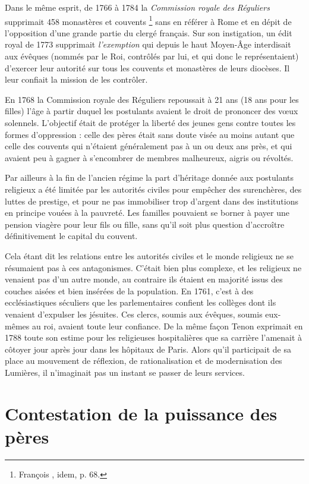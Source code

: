  Dans le même esprit, de 1766 à 1784 la \emph{Commission royale des Réguliers} supprimait 458 monastères et couvents%
\footnote{François , idem, p. 68.} 
sans en référer à Rome et en dépit de l'opposition d'une grande partie du clergé français. Sur son instigation, un édit royal de 1773 supprimait \emph{l'exemption} qui depuis le haut Moyen-Âge interdisait aux évêques (nommés par le Roi, contrôlés par lui, et qui donc le représentaient) d'exercer leur autorité sur tous les couvents et monastères de leurs diocèses. Il leur confiait la mission de les contrôler. 

 En 1768 la Commission royale des Réguliers repoussait à 21 ans (18 ans pour les filles) l'âge à partir duquel les postulants avaient le droit de prononcer des vœux solennels. L'objectif était de protéger la liberté des jeunes gens contre toutes les formes d'oppression : celle des pères était sans doute visée au moins autant que celle des couvents qui n'étaient généralement pas à un ou deux ans près, et qui avaient peu à gagner à s'encombrer de membres malheureux, aigris ou révoltés.

 Par ailleurs à la fin de l'ancien régime la part d'héritage donnée aux postulants religieux a été limitée par les autorités civiles pour empêcher des surenchères, des luttes de prestige, et pour ne pas immobiliser trop d'argent dans des institutions en principe vouées à la pauvreté. Les familles pouvaient se borner à payer une pension viagère pour leur fils ou fille, sans qu'il soit plus question d'accroître définitivement le capital du couvent.

 Cela étant dit les relations entre les autorités civiles et le monde religieux ne se résumaient pas à ces antagonismes. C'était bien plus complexe, et les religieux ne venaient pas d'un autre monde, au contraire ils étaient en majorité issus des couches aisées et bien insérées de la population. En 1761, c'est à des ecclésiastiques séculiers que les parlementaires confient les collèges dont ils venaient d'expulser les jésuites. Ces clercs, soumis aux évêques, soumis eux-mêmes au roi, avaient toute leur confiance. De la même façon {Tenon} exprimait en 1788 toute son estime pour les religieuses hospitalières que sa carrière l'amenait à côtoyer jour après jour dans les hôpitaux de Paris. Alors qu'il participait de sa place au mouvement de réflexion, de rationalisation et de modernisation des Lumières, il n'imaginait pas un instant se passer de leurs services. 


\section{Contestation de la puissance des pères}

